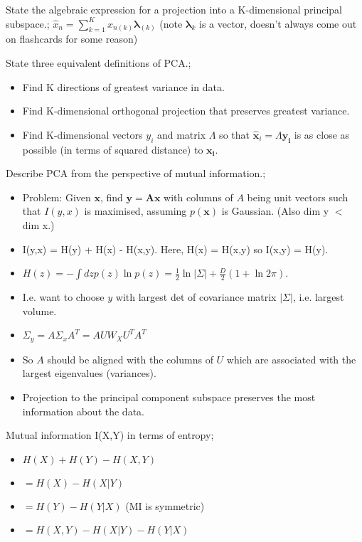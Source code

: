 \documentclass{article}
\begin{document}
State the algebraic expression for a projection into a K-dimensional principal subspace.; $\hat{x}_n = \sum_{k=1}^K x_{n(k)}\mathbf{\lambda}_{(k)}$ (note $\mathbf{\lambda}_k$ is a vector, doesn't always come out on flashcards for some reason)

State three equivalent definitions of PCA.; \begin{itemize} \item Find K directions of greatest variance in data.  \item Find K-dimensional orthogonal projection that preserves greatest variance.  \item Find K-dimensional vectors $y_i$ and matrix $\Lambda$ so that $\hat{\mathbf{x}}_i = \Lambda\mathbf{y_i}$ is as close as possible (in terms of squared distance) to $\mathbf{x_i}$.  \end{itemize}

Describe PCA from the perspective of mutual information.; \begin{itemize} \item Problem: Given $\mathbf{x}$, find $\mathbf{y = Ax}$ with columns of $A$ being unit vectors such that $I(y,x)$ is maximised, assuming $p(\mathbf{x})$ is Gaussian. (Also dim y $<$ dim x.) \item I(y,x) = H(y) + H(x) - H(x,y). Here, H(x) = H(x,y) so I(x,y) = H(y).  \item $H(z)=-\int dz p(z) \ln p(z) = \frac{1}{2}\ln|\Sigma|+\frac{D}{2}(1+\ln 2\pi )$.  \item I.e. want to choose $y$ with largest det of covariance matrix $|\Sigma|$, i.e. largest volume.  \item $\Sigma_y = A\Sigma_x A^T = AUW_XU^TA^T$ \item So $A$ should be aligned with the columns of $U$ which are associated with the largest eigenvalues (variances).  \item Projection to the principal component subspace preserves the most information about the data.  \end{itemize}

Mutual information I(X,Y) in terms of entropy; \begin{itemize} \item $H(X)+H(Y)-H(X,Y)$ \item $=H(X)-H(X|Y)$ \item $= H(Y) - H(Y|X)$ (MI is symmetric) \item $=H(X,Y)-H(X|Y)-H(Y|X)$ \end{itemize}
\end{document}
